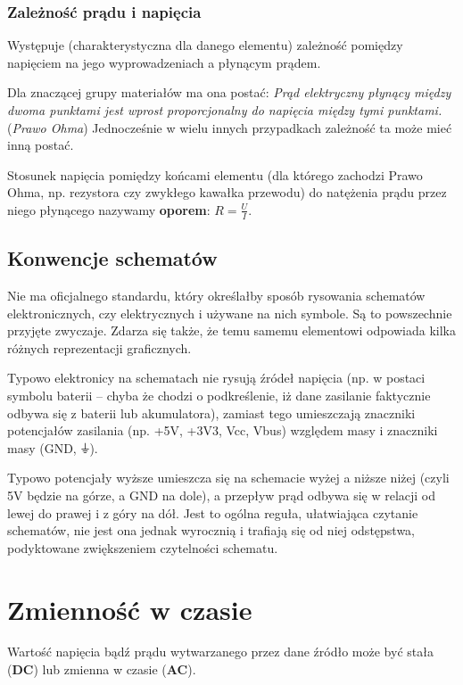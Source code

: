\subsubsection{Zależność prądu i napięcia}

Występuje (charakterystyczna dla danego elementu) zależność pomiędzy napięciem na jego wyprowadzeniach a płynącym prądem. 

Dla znaczącej grupy materiałów ma ona postać:
	\textit{Prąd elektryczny płynący między dwoma punktami jest wprost proporcjonalny do napięcia między tymi punktami.} (\textit{Prawo Ohma})
Jednocześnie w wielu innych przypadkach zależność ta może mieć inną postać.

Stosunek napięcia pomiędzy końcami elementu (dla którego zachodzi Prawo Ohma, np. rezystora czy zwykłego kawałka przewodu) do natężenia prądu przez niego płynącego nazywamy \textbf{oporem}: $R=\frac{U}{I}$.

\subsection{Konwencje schematów}

Nie ma oficjalnego standardu, który określałby sposób rysowania schematów elektronicznych, czy elektrycznych i używane na nich symbole. Są to powszechnie przyjęte zwyczaje. Zdarza się także, że temu samemu elementowi odpowiada kilka różnych reprezentacji graficznych.

Typowo elektronicy na schematach nie rysują źródeł napięcia (np. w postaci symbolu baterii – chyba że chodzi o podkreślenie, iż dane zasilanie faktycznie odbywa się z baterii lub akumulatora), zamiast tego umieszczają znaczniki potencjałów zasilania (np. +5V, +3V3, Vcc, Vbus) względem masy i znaczniki masy (GND, ⏚).

Typowo potencjały wyższe umieszcza się na schemacie wyżej a niższe niżej (czyli 5V będzie na górze, a GND na dole), a przepływ prąd odbywa się w relacji od lewej do prawej i z góry na dół. Jest to ogólna reguła, ułatwiająca czytanie schematów, nie jest ona jednak wyrocznią i trafiają się od niej odstępstwa, podyktowane zwiększeniem czytelności schematu.

\section{Zmienność w czasie}

Wartość napięcia bądź prądu wytwarzanego przez dane źródło może być stała (\textbf{DC}) lub zmienna w czasie (\textbf{AC}).

